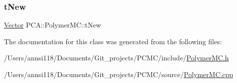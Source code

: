\hypertarget{class_p_c_a_1_1_polymer_m_c_a1220187032c23f9fd2d78886fd1815b3}{}\label{class_p_c_a_1_1_polymer_m_c_a1220187032c23f9fd2d78886fd1815b3} 
\subsubsection{\texorpdfstring{t\+New}{tNew}}
{\footnotesize\ttfamily \hyperlink{class_p_c_a_1_1_vector}{Vector} P\+C\+A\+::\+Polymer\+M\+C\+::t\+New\hspace{0.3cm}{\ttfamily [private]}}



The documentation for this class was generated from the following files\+:\begin{DoxyCompactItemize}
\item 
/\+Users/annsi118/\+Documents/\+Git\+\_\+projects/\+P\+C\+M\+C/include/\hyperlink{_polymer_m_c_8h}{Polymer\+M\+C.\+h}\item 
/\+Users/annsi118/\+Documents/\+Git\+\_\+projects/\+P\+C\+M\+C/source/\hyperlink{_polymer_m_c_8cpp}{Polymer\+M\+C.\+cpp}\end{DoxyCompactItemize}
